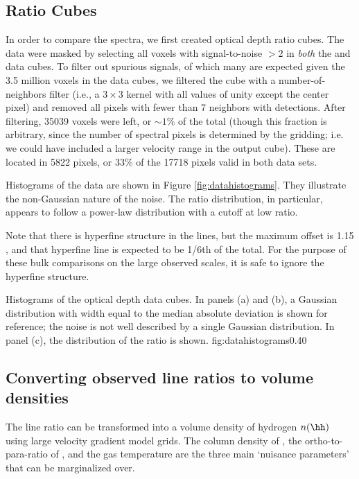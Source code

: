 \subsection{Ratio Cubes}
In order to compare the \formaldehyde spectra, we first
created optical depth ratio cubes.  The data were masked by selecting all
voxels with signal-to-noise $>2$ in  \emph{both} the \oneone and \twotwo data
cubes.  To filter out spurious signals, of which many are expected given the
3.5 million voxels in the data cubes, we filtered the cube with a
number-of-neighbors filter (i.e., a $3\times3$ kernel with all values of unity
except the center pixel) and removed all pixels with fewer than 7 neighbors
with detections.  After filtering, 35039 voxels were left, or $\sim 1\%$ of the
total (though this fraction is arbitrary, since the number of spectral pixels
is determined by the gridding; i.e. we could have included a larger velocity
range in the output cube).  These are located in 5822 pixels, or 33\% of
the 17718 pixels valid in both data sets.

Histograms of the data are shown in Figure \ref{fig:datahistograms}.  They
illustrate the non-Gaussian nature of the noise.  The ratio distribution, in
particular, appears to follow a power-law distribution with a cutoff at low
ratio.

Note that there is hyperfine structure in the \oneone lines, but the maximum
offset is 1.15 \kms, and that hyperfine line is expected to be 1/6th of the
total.  For the purpose of these bulk comparisons on the large observed scales,
it is safe to ignore the hyperfine structure.

{Histograms of the optical depth data cubes.  In panels (a) and (b),
a Gaussian distribution with width equal to the median absolute deviation
is shown for reference; the noise is not well described by a single Gaussian
distribution.  In panel (c), the distribution of the ratio is shown.}
{fig:datahistograms}{0.4}{0}


\subsection{Converting observed line ratios to volume densities}
\label{sec:models}
The \formaldehyde line ratio can be transformed into a volume
density of hydrogen $n(\hh)$ using large velocity gradient model grids.
The column density of \ortho, the ortho-to-para-ratio of \hh, and the gas
temperature are the three main `nuisance parameters' that can be marginalized
over.

